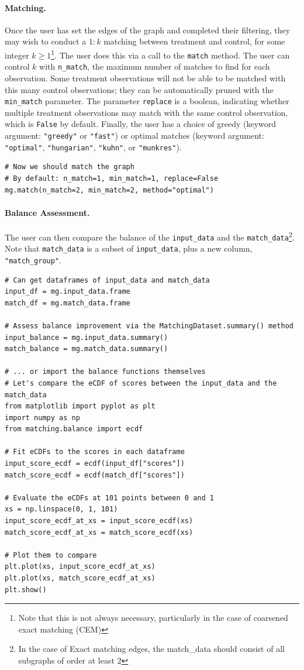\documentclass[11pt]{extarticle}
\begin{document}
\paragraph{Matching.} Once the user has set the edges of the graph and completed their filtering, they may wish to conduct a $1:k$ matching between treatment and control, for some integer $k \geq 1$\footnote{Note that this is not always necessary, particularly in the case of coarsened exact matching (CEM)}.
The user does this via a call to the \texttt{match} method. The user can control $k$ with \texttt{n\_match}, the maximum number of matches to find for each observation. Some treatment observations will not be able to be matched with this many control observations; they can be automatically pruned with the \texttt{min\_match} parameter. The parameter \texttt{replace} is a boolean, indicating whether multiple treatment observations may match with the same control observation, which is \texttt{False} by default. Finally, the user has a choice of greedy (keyword argument: \texttt{"greedy"} or \texttt{"fast"}) or optimal matches (keyword argument: \texttt{"optimal"}, \texttt{"hungarian"}, \texttt{"kuhn"}, or \texttt{"munkres"}).
\begin{verbatim}
# Now we should match the graph
# By default: n_match=1, min_match=1, replace=False
mg.match(n_match=2, min_match=2, method="optimal")
\end{verbatim}

\paragraph{Balance Assessment.} The user can then compare the balance of the \texttt{input\_data} and the \texttt{match\_data}\footnote{In the case of Exact matching edges, the match\_data should consist of all subgraphs of order at least 2}. Note that \texttt{match\_data} is a subset of \texttt{input\_data}, plus a new column, \texttt{"match\_group"}.
\begin{verbatim}
# Can get dataframes of input_data and match_data
input_df = mg.input_data.frame
match_df = mg.match_data.frame

# Assess balance improvement via the MatchingDataset.summary() method
input_balance = mg.input_data.summary()
match_balance = mg.match_data.summary()

# ... or import the balance functions themselves
# Let's compare the eCDF of scores between the input_data and the match_data
from matplotlib import pyplot as plt
import numpy as np
from matching.balance import ecdf

# Fit eCDFs to the scores in each dataframe
input_score_ecdf = ecdf(input_df["scores"])
match_score_ecdf = ecdf(match_df["scores"])

# Evaluate the eCDFs at 101 points between 0 and 1
xs = np.linspace(0, 1, 101)
input_score_ecdf_at_xs = input_score_ecdf(xs)
match_score_ecdf_at_xs = match_score_ecdf(xs)

# Plot them to compare
plt.plot(xs, input_score_ecdf_at_xs)
plt.plot(xs, match_score_ecdf_at_xs)
plt.show()
\end{verbatim}
\end{document}
